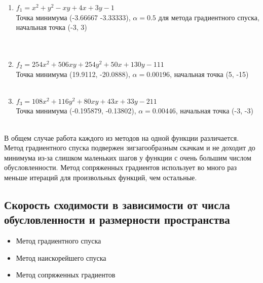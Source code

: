 	\begin{enumerate}
		\item \(f_1 = x^2 + y^2 - xy + 4x + 3y - 1\) \\
		Точка минимума (-3.66667 -3.33333), $\alpha = 0.5$ для метода градиентного спуска, начальная точка (-3, 3) \\
		\\
		\\[5mm]
		
		
		\item \(f_2 = 254x^2 + 506xy + 254y^2 + 50x + 130y - 111\) \\
		Точка минимума (19.9112, -20.0888), $\alpha = 0.00196$,
		начальная точка (5, -15)\\
		\\[5mm]
		
		\item \(f_3 = 108x^2 + 116y^2 + 80xy + 43x + 33y - 211\) \\
		Точка минимума (-0.195879, -0.13802), $\alpha = 0.00446$,
		начальная точка (-3, -3)  \\
		 \\[5mm]
		
		
	\end{enumerate}
	
	В общем случае работа каждого из методов на одной функции различается. Метод градиентного спуска подвержен зигзагообразным скачкам и не доходит до минимума из-за слишком маленьких шагов у функции с очень большим числом обусловленности. Метод сопряженных градиентов использует во много раз меньше итераций для произвольных функций, чем остальные.
	
	\subsection{Скорость сходимости в зависимости от числа обусловленности и размерности пространства}
	
	\begin{itemize}
		\item Метод градиентного спуска
		
		\item Метод наискорейшего спуска
		
		\item Метод сопряженных градиентов
	\end{itemize}
	
